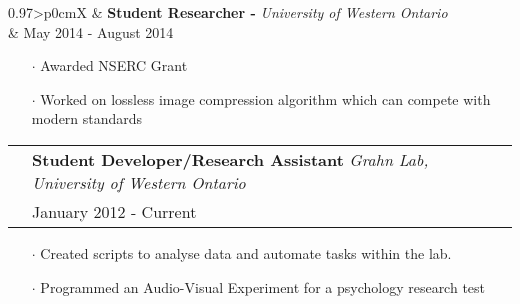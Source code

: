 \documentclass[letterpaper, oneside, final]{scrartcl} %
\newcommand{\gray}{\rowcolor[gray]{.90}} %
\begin{document}
\begin{center}
\vspace{-0.05cm}

\begin{tabularx}{0.97\linewidth}{>{\raggedleft\scshape}p{0cm}X}
\gray & \textbf{Student Researcher -} \textit{University of Western Ontario}\\
\gray & {May 2014 - August 2014}\\
\end{tabularx}
\vspace{-0.1cm}
\begin{itemize}\itemsep-0.2cm
\item[$\cdot$] Awarded NSERC Grant
\item[$\cdot$] Worked on lossless image compression algorithm which can compete with modern standards\\
\end{itemize}

\vspace{-0.05cm}

\begin{tabularx}{0.97\linewidth}{>{\raggedleft\scshape}p{0cm}X}
\gray & \textbf{Student Developer/Research Assistant} \textit{Grahn Lab, University of Western Ontario}\\
\gray & {January 2012 - Current}\\
\end{tabularx}
\vspace{-0.1cm}
\begin{itemize} \itemsep-0.2cm
\item[$\cdot$] Created scripts to analyse data and automate tasks within the lab.
\item[$\cdot$] Programmed an Audio-Visual Experiment for a psychology research test\\
\end{itemize}

\vspace{-0.05cm}



\end{center}
\end{document}
